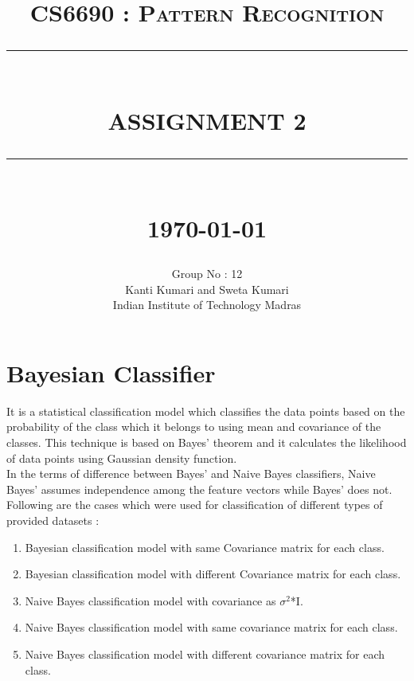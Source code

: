 \documentclass[10pt]{report}
\newcommand{\HRule}[1]{\rule{\linewidth}{#1}}
\begin{document}
\title{ \normalsize \textsc{CS6690 : Pattern Recognition}
		\\ [2.0cm]\HRule{0.5pt} \\
        \LARGE \textbf{\uppercase{Assignment 2}}
		\HRule{2pt} \\ [0.5cm]
		\normalsize \today \vspace*{5\baselineskip}}
\date{}
\author{Group No : 12 \\ Kanti Kumari and Sweta Kumari \\Indian Institute of Technology Madras }
\maketitle
\newpage
\sectionfont{\scshape}


\section{Bayesian Classifier}
It is a statistical classification model which classifies the data points based on the probability of the class which it belongs to using mean and covariance of the classes. This technique is based on Bayes' theorem and it calculates the likelihood of data points using Gaussian density function.\\
In the terms of difference between Bayes' and Naive Bayes classifiers, Naive Bayes' assumes independence among the feature vectors while Bayes' does not.
Following are the cases which were used for classification of different types of provided datasets :
\begin{enumerate}
\item Bayesian classification model with same Covariance matrix for each class.
\item Bayesian classification model with different Covariance matrix for each class.
\item Naive Bayes classification model with covariance as $\sigma^2$*I.
\item Naive Bayes classification model with same covariance matrix for each class. 
\item Naive Bayes classification model with different covariance matrix for each class. 
\end{enumerate}
                       
\end{document}
